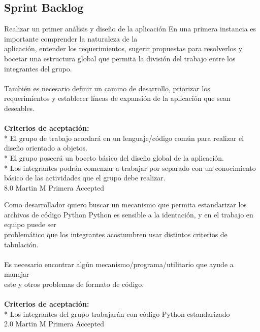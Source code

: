 \subsection{Sprint Backlog}
	{Realizar un primer análisis y diseño de la aplicación} %
	{En una primera instancia es importante comprender la naturaleza de la\\
aplicación, entender los requerimientos, sugerir propuestas para resolverlos y\\
bocetar una estructura global que permita la división del trabajo entre los\\
integrantes del grupo.\\
  \\
También es necesario definir un camino de desarrollo, priorizar los\\
requerimientos y establecer líneas de expansión de la aplicación que sean\\
deseables.\\
  \\
\textbf{Criterios de aceptación:}\\
* El grupo de trabajo acordará en un lenguaje/código común para realizar el diseño orientado a objetos.  \\
* El grupo poseerá un boceto básico del diseño global de la aplicación.  \\
* Los integrantes podrán comenzar a trabajar por separado con un conocimiento básico de las actividades que el grupo debe realizar.  \\
} %
	{} %
	{8.0} %
	{Martin M} %
	{Primera} %
	{Accepted} %


\vspace{20pt}

	{Como desarrollador quiero buscar un mecanismo que permita estandarizar los archivos de código Python} %
	{Python es sensible a la identación, y en el trabajo en equipo puede ser\\
problemático que los integrantes acostumbren usar distintos criterios de\\
tabulación.\\
  \\
Es necesario encontrar algún mecanismo/programa/utilitario que ayude a manejar\\
este y otros problemas de formato de código.\\
  \\
\textbf{Criterios de aceptación:}\\
* Los integrantes del grupo trabajarán con código Python estandarizado  \\
} %
	{} %
	{2.0} %
	{Martin M} %
	{Primera} %
	{Accepted} %


